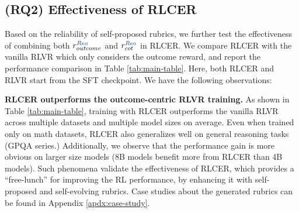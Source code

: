 \subsection{(RQ2) Effectiveness of RLCER} \label{sec:main-performance}
Based on the reliability of self-proposed rubrics, we further test the effectiveness of combining both $r^{\text{\textcolor{reasoner}{$Rea$}}}_{outcome}$ and $r_{cot}^{\text{\textcolor{reasoner}{$Rea$}}}$ in RLCER. 
We compare RLCER with the vanilla RLVR which only considers the outcome reward, and report the performance comparison in Table \ref{tab:main-table}. 
Here, both RLCER and RLVR start from the SFT checkpoint.
We have the following observations: 


\textbf{RLCER outperforms the outcome-centric RLVR training. }
As shown in Table \ref{tab:main-table}, training with RLCER outperforms the vanilla RLVR across multiple datasets and multiple model sizes on average. 
Even when trained only on math datasets, RLCER also generalizes well on general reasoning tasks (\ie GPQA series.)
Additionally, we observe that the performance gain is more obvious on larger size models (\ie 8B models benefit more from RLCER than 4B models). 
Such phenomena validate the effectiveness of RLCER, which provides a ``free-lunch'' for improving the RL performance, by enhancing it with self-proposed and self-evolving rubrics. 
Case studies about the generated rubrics can be found in Appendix \ref{apdx:case-study}. 



\newcommand{\EMainTableScale}{0.99 }

